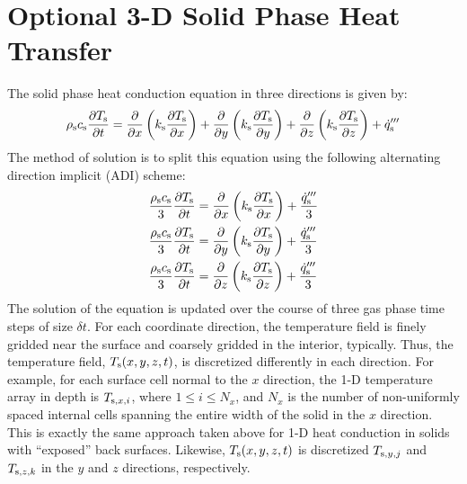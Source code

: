 \section{Optional 3-D Solid Phase Heat Transfer}

The solid phase heat conduction equation in three directions is given by:
\begin{equation}
\label{ht3d}
  \rho_{\rm s} c_{\rm s} \frac{\partial T_{\rm s}}{\partial t} = \frac{\partial}{\partial x} \left( k_{\rm s} \frac{\partial T_{\rm s}}{\partial x} \right) +
                                                                 \frac{\partial}{\partial y} \left( k_{\rm s} \frac{\partial T_{\rm s}}{\partial y} \right) +
                                                                 \frac{\partial}{\partial z} \left( k_{\rm s} \frac{\partial T_{\rm s}}{\partial z} \right) + \dot{q}'''_{\rm s}
\end{equation}
The method of solution is to split this equation using the following alternating direction implicit (ADI) scheme:
\begin{align}
\label{ht3d_xyz}
 \frac{ \rho_{\rm s} c_{\rm s}}{3} \frac{\partial T_{{\rm s}}}{\partial t} & = \frac{\partial}{\partial x} \left( k_{\rm s} \frac{\partial T_{{\rm s}}}{\partial x} \right) + \frac{\dot{q}'''_{\rm s}}{3} \\
 \frac{ \rho_{\rm s} c_{\rm s}}{3} \frac{\partial T_{{\rm s}}}{\partial t} & = \frac{\partial}{\partial y} \left( k_{\rm s} \frac{\partial T_{{\rm s}}}{\partial y} \right) + \frac{\dot{q}'''_{\rm s}}{3} \\
 \frac{ \rho_{\rm s} c_{\rm s}}{3} \frac{\partial T_{{\rm s}}}{\partial t} & = \frac{\partial}{\partial z} \left( k_{\rm s} \frac{\partial T_{{\rm s}}}{\partial z} \right) + \frac{\dot{q}'''_{\rm s}}{3}
\end{align}
The solution of the equation is updated over the course of three gas phase time steps of size $\delta t$. For each coordinate direction, the temperature field is finely gridded near the surface and coarsely gridded in the interior, typically. Thus, the temperature field, $T_{\rm s}(x,y,z,t)$, is discretized differently in each direction. For example, for each surface cell normal to the $x$ direction, the 1-D temperature array in depth is $T_{{\rm s},x,i}$, where $1\le i \le N_x$, and $N_x$ is the number of non-uniformly spaced internal cells spanning the entire width of the solid in the $x$ direction. This is exactly the same approach taken  above for 1-D heat conduction in solids with ``exposed'' back surfaces. Likewise, $T_{\rm s}(x,y,z,t)$ is discretized $T_{{\rm s},y,j}$ and $T_{{\rm s},z,k}$ in the $y$ and $z$ directions, respectively.

